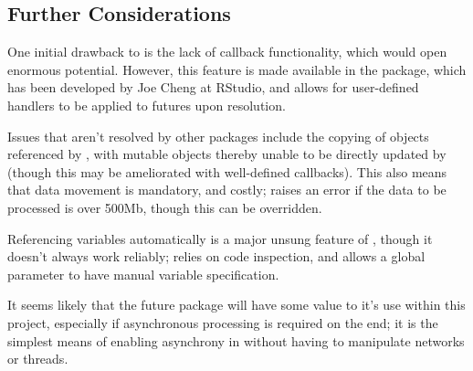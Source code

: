 \subsection{Further Considerations}\label{subsec:further-considerations}

One initial drawback to  is the lack of callback functionality,
which would open enormous potential. However, this feature is made
available in the  package, which has been developed by
Joe Cheng at RStudio, and allows for user-defined handlers to be
applied to futures upon resolution\cite{Cheng19}.

Issues that aren't resolved by other packages include the copying of
objects referenced by , with mutable objects thereby unable to be
directly updated by  (though this may be ameliorated with
well-defined callbacks). This also means that data movement is
mandatory, and costly;  raises an error if the data to be
processed is over 500Mb, though this can be overridden.

Referencing variables automatically is a major unsung feature of ,
though it doesn't always work reliably;  relies on code
inspection, and allows a global parameter to have manual
variable specification.

It seems likely that the future package will have some value to it's
use within this project, especially if asynchronous processing is required on the \R{} end; it
is the simplest means of enabling asynchrony in \R{} without having to
manipulate networks or threads.
